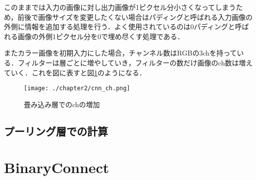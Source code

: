 このままでは入力の画像に対し出力画像が1ピクセル分小さくなってしまうため，前後で画像サイズを変更したくない場合はパディングと呼ばれる入力画像の外側に情報を追加する処理を行う．よく使用されているのは0パディングと呼ばれる画像の外側1ピクセル分を0で埋め尽くす処理である．

またカラー画像を初期入力にした場合，チャンネル数はRGBの3chを持っている．フィルターは層ごとに増やしていき，フィルターの数だけ画像のch数は増えていく．これを図に表すと図\ref{fig_cnn_ch}のようになる．
\begin{figure}[]
  \begin{center}
    \texttt{[image: ./chapter2/cnn\_ch.png]}
    \caption{畳み込み層でのchの増加}
    \label{fig_cnn_ch}
  \end{center}
\end{figure}

\subsection{プーリング層での計算}

\section{BinaryConnect}

